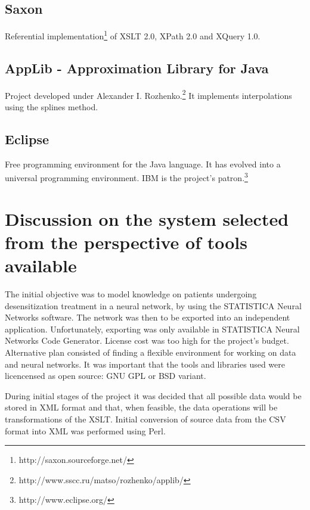 \documentclass[10pt,oneside]{memoir}
\begin{document}
\section{Saxon}
\label{saxon}

Referential implementation\footnote{http://saxon.sourceforge.net/} of  XSLT 2.0, XPath 2.0 and XQuery 1.0.


\section{AppLib - Approximation Library for Java}
\label{applib-approximationlibraryforjava}

Project developed under Alexander I. Rozhenko.\footnote{http://www.sscc.ru/matso/rozhenko/applib/} It implements interpolations using the splines method.


\section{Eclipse}
\label{eclipse}

Free programming environment for the Java language. It has evolved into a universal programming environment. IBM is the project's patron.\footnote{http://www.eclipse.org/}


\chapter{Discussion on the system selected from the perspective of tools available}
\label{discussiononthesystemselectedfromtheperspectiveoftoolsavailable}

The initial objective was to model knowledge on patients undergoing desensitization treatment in a neural network, by using the STATISTICA Neural Networks software. The network was then to be exported into an independent application. Unfortunately, exporting was only available in STATISTICA Neural Networks Code Generator. License cost was too high for the project's budget.
Alternative plan consisted of finding a flexible environment for working on data and neural networks. It was important that the tools and libraries used were licencensed as open source: GNU GPL or BSD variant.


During initial stages of the project it was decided that all possible data would be stored in XML format and that, when feasible, the data operations will be transformations of the XSLT. Initial conversion of source data from the CSV format into XML was performed using Perl.
\end{document}
